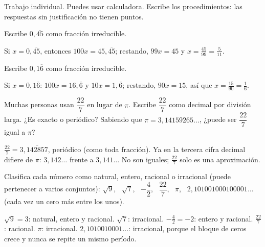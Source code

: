 \documentclass[11pt]{article}
\begin{document}
\encabezado

\begin{instrucciones}
Trabajo individual. Puedes usar calculadora. Escribe los procedimientos: las respuestas sin
justificación no tienen puntos.
\end{instrucciones}

\begin{preguntas}

\pregunta[1] Escribe $0{,}\overline{45}$ como fracción irreducible.
\espacio{2.5cm}
\begin{solucion}
Si $x = 0{,}\overline{45}$, entonces $100x = 45{,}\overline{45}$; restando, $99x = 45$ y
$x = \frac{45}{99} = \frac{5}{11}$.
\end{solucion}

\pregunta[1] Escribe $0{,}1\overline{6}$ como fracción irreducible.
\espacio{2.5cm}
\begin{solucion}
Si $x = 0{,}1\overline{6}$: $100x = 16{,}\overline{6}$ y $10x = 1{,}\overline{6}$; restando,
$90x = 15$, así que $x = \frac{15}{90} = \frac{1}{6}$.
\end{solucion}

\pregunta[1.5] Muchas personas usan $\dfrac{22}{7}$ en lugar de $\pi$. Escribe $\dfrac{22}{7}$
como decimal por división larga. ¿Es exacto o periódico? Sabiendo que
$\pi = 3{,}14159265\ldots$, ¿puede ser $\dfrac{22}{7}$ igual a $\pi$?
\espacio{3cm}
\begin{solucion}
$\frac{22}{7} = 3{,}\overline{142857}$, periódico (como toda fracción). Ya en la tercera cifra
decimal difiere de $\pi$: $3{,}142\ldots$ frente a $3{,}141\ldots$ No son iguales;
$\frac{22}{7}$ solo es una aproximación.
\end{solucion}

\pregunta[1.5] Clasifica cada número como natural, entero, racional o irracional (puede
pertenecer a varios conjuntos): $\sqrt{9}$, \ $\sqrt{7}$, \ $-\dfrac{4}{2}$, \ $\dfrac{22}{7}$,
\ $\pi$, \ $2{,}101001000100001\ldots$ (cada vez un cero más entre los unos).
\espacio{3cm}
\begin{solucion}
$\sqrt{9} = 3$: natural, entero y racional. $\sqrt{7}$: irracional. $-\frac{4}{2} = -2$: entero
y racional. $\frac{22}{7}$: racional. $\pi$: irracional. $2{,}1010010001\ldots$: irracional,
porque el bloque de ceros crece y nunca se repite un mismo período.
\end{solucion}

\end{preguntas}
\end{document}

